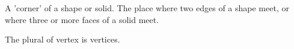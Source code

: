 A 'corner' of a shape or solid. The place where two
edges of a shape meet, or where three or more faces
of a solid meet.
\par
The plural of vertex is vertices.